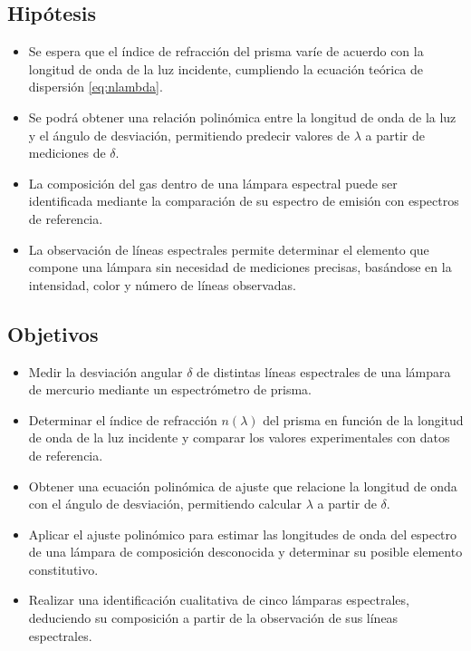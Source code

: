 \documentclass[article,12pt]{elsarticle}
\begin{document}
\subsection{Hipótesis}
\begin{itemize}
    \item Se espera que el índice de refracción del prisma varíe de acuerdo con la longitud de onda de la luz incidente, cumpliendo la ecuación teórica de dispersión \eqref{eq:nlambda}.
    \item Se podrá obtener una relación polinómica entre la longitud de onda de la luz y el ángulo de desviación, permitiendo predecir valores de \( \lambda \) a partir de mediciones de \( \delta \).
    \item La composición del gas dentro de una lámpara espectral puede ser identificada mediante la comparación de su espectro de emisión con espectros de referencia.
    \item La observación de líneas espectrales permite determinar el elemento que compone una lámpara sin necesidad de mediciones precisas, basándose en la intensidad, color y número de líneas observadas.
\end{itemize}


\subsection{Objetivos}

\begin{itemize}
    \item Medir la desviación angular \( \delta \) de distintas líneas espectrales de una lámpara de mercurio mediante un espectrómetro de prisma.
    \item Determinar el índice de refracción \( n(\lambda) \) del prisma en función de la longitud de onda de la luz incidente y comparar los valores experimentales con datos de referencia.
    \item Obtener una ecuación polinómica de ajuste que relacione la longitud de onda con el ángulo de desviación, permitiendo calcular \( \lambda \) a partir de \( \delta \).
    \item Aplicar el ajuste polinómico para estimar las longitudes de onda del espectro de una lámpara de composición desconocida y determinar su posible elemento constitutivo.
    \item Realizar una identificación cualitativa de cinco lámparas espectrales, deduciendo su composición a partir de la observación de sus líneas espectrales.
\end{itemize}
\end{document}
